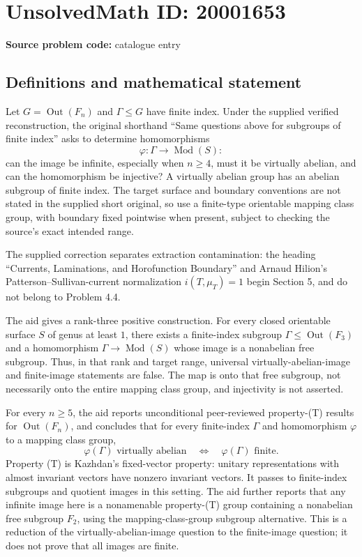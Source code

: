 \documentclass[11pt]{article}
\begin{document}
\section*{UnsolvedMath ID: 20001653}
\textbf{Source problem code:} catalogue entry
\subsection{Definitions and mathematical statement}
Let \(G=\operatorname{Out}(F_n)\) and \(\Gamma\leq G\) have finite index. Under the supplied verified reconstruction, the original shorthand ``Same questions above for subgroups of finite index'' asks to determine homomorphisms
\[
 \varphi:\Gamma\longrightarrow\operatorname{Mod}(S):
\]
can the image be infinite, especially when \(n\geq4\), must it be virtually abelian, and can the homomorphism be injective? A virtually abelian group has an abelian subgroup of finite index. The target surface and boundary conventions are not stated in the supplied short original, so use a finite-type orientable mapping class group, with boundary fixed pointwise when present, subject to checking the source's exact intended range.

The supplied correction separates extraction contamination: the heading ``Currents, Laminations, and Horofunction Boundary'' and Arnaud Hilion's Patterson--Sullivan-current normalization \(i(T,\mu_T)=1\) begin Section 5, and do not belong to Problem 4.4.

The aid gives a rank-three positive construction. For every closed orientable surface \(S\) of genus at least \(1\), there exists a finite-index subgroup \(\Gamma\leq\operatorname{Out}(F_3)\) and a homomorphism \(\Gamma\to\operatorname{Mod}(S)\) whose image is a nonabelian free subgroup. Thus, in that rank and target range, universal virtually-abelian-image and finite-image statements are false. The map is onto that free subgroup, not necessarily onto the entire mapping class group, and injectivity is not asserted.

For every \(n\geq5\), the aid reports unconditional peer-reviewed property-(T) results for \(\operatorname{Out}(F_n)\), and concludes that for every finite-index \(\Gamma\) and homomorphism \(\varphi\) to a mapping class group,
\[
 \varphi(\Gamma)\text{ virtually abelian}
 \quad\Longleftrightarrow\quad\varphi(\Gamma)\text{ finite}.
\]
Property (T) is Kazhdan's fixed-vector property: unitary representations with almost invariant vectors have nonzero invariant vectors. It passes to finite-index subgroups and quotient images in this setting. The aid further reports that any infinite image here is a nonamenable property-(T) group containing a nonabelian free subgroup \(F_2\), using the mapping-class-group subgroup alternative. This is a reduction of the virtually-abelian-image question to the finite-image question; it does not prove that all images are finite.
\end{document}
